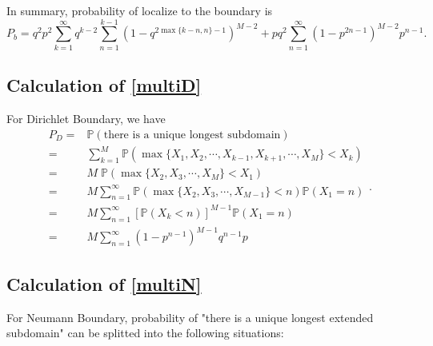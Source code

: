 \documentclass[a4paper,11pt]{article}
\begin{document}
\begin{appendices}
In summary, probability of localize to the boundary is
\begin{equation*}
P_b = q^2 p^2 \sum_{k=1}^{\infty} q^{k-2} \sum_{n=1}^{k-1} (1 - q^{2 \max\{k-n,n\}-1})^{M-2} + p q^2 \sum_{n=1}^{\infty} (1 - p^{2 n-1})^{M-2} p^{n-1}.
\end{equation*}

\subsection{Calculation of \eqref{multiD}}\label{AppendixB2}

For Dirichlet Boundary, we have
\begin{equation*}
\begin{split}
P_D = & \mathbb{P}(\text{there is a unique longest subdomain}) \\
= & \sum_{k=1}^{M} \mathbb{P}(\max\{X_1, X_2, \cdots, X_{k-1}, X_{k+1}, \cdots, X_{M}\} < X_k) \\
= & M \; \mathbb{P}(\max\{X_{2}, X_{3}, \cdots, X_{M}\} < X_1) \\
= & M \sum_{n=1}^{\infty} \mathbb{P}(\max\{X_2, X_3, \cdots, X_{M-1}\} < n) \mathbb{P}(X_1 = n) \\
= & M \sum_{n=1}^{\infty} [\mathbb{P}(X_k < n)]^{M-1} \mathbb{P}(X_1 = n)\\
= & M \sum_{n=1}^{\infty} (1 - p^{n-1})^{M-1} q^{n-1} p
\end{split}.
\end{equation*}

\subsection{Calculation of \eqref{multiN}}\label{AppendixB3}

For Neumann Boundary, probability of "there is a unique longest extended subdomain" can be splitted into the following situations:


\end{appendices}
\end{document}
